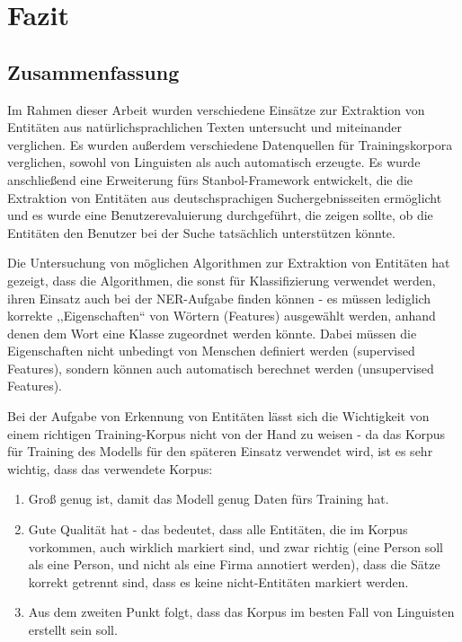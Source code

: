 \chapter{Fazit}

\section{Zusammenfassung}
Im Rahmen dieser Arbeit wurden verschiedene Einsätze zur Extraktion von Entitäten aus natürlichsprachlichen Texten untersucht und miteinander verglichen. Es wurden außerdem verschiedene Datenquellen für Trainingskorpora verglichen, sowohl von Linguisten als auch automatisch erzeugte. Es wurde anschließend eine Erweiterung fürs Stanbol-Framework entwickelt, die die Extraktion von Entitäten aus deutschsprachigen Suchergebnisseiten ermöglicht und es wurde eine Benutzerevaluierung durchgeführt, die zeigen sollte, ob die Entitäten den Benutzer bei der Suche tatsächlich unterstützen könnte. 

Die Untersuchung von möglichen Algorithmen zur Extraktion von Entitäten hat gezeigt, dass die Algorithmen, die sonst für Klassifizierung verwendet werden, ihren Einsatz auch bei der NER-Aufgabe finden können - es müssen lediglich korrekte ,,Eigenschaften`` von Wörtern (Features) ausgewählt werden, anhand denen dem Wort eine Klasse zugeordnet werden könnte. Dabei müssen die Eigenschaften nicht unbedingt von Menschen definiert werden (supervised Features), sondern können auch automatisch berechnet werden (unsupervised Features).

Bei der Aufgabe von Erkennung von Entitäten lässt sich die Wichtigkeit von einem richtigen Training-Korpus nicht von der Hand zu weisen - da das Korpus für Training des Modells für den späteren Einsatz verwendet wird, ist es sehr wichtig, dass das verwendete Korpus:
\begin{enumerate}
\item Groß genug ist, damit das Modell genug Daten fürs Training hat.
\item Gute Qualität hat - das bedeutet, dass alle Entitäten, die im Korpus vorkommen, auch wirklich markiert sind, und zwar richtig (eine Person soll als eine Person, und nicht als eine Firma annotiert werden), dass die Sätze korrekt getrennt sind, dass es keine nicht-Entitäten markiert werden.
\item Aus dem zweiten Punkt folgt, dass das Korpus im besten Fall von Linguisten erstellt sein soll.
\end{enumerate}

